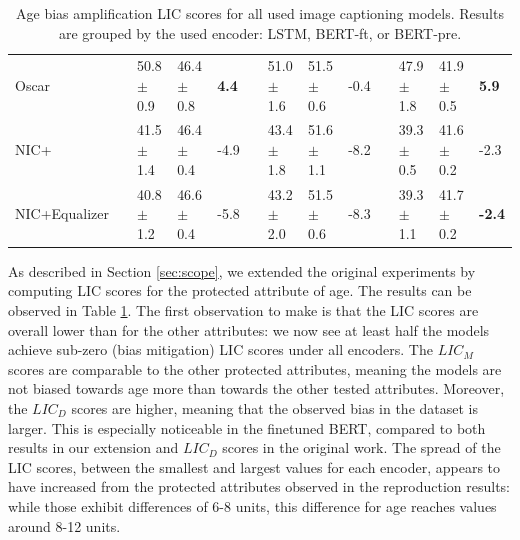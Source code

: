 \begin{table}[ht]
\begin{adjustbox}{width=\columnwidth,center}
\begin{tabular}{@{}lllllllllllll@{}}
 Oscar           &  & 50.8 $\pm$ 0.9  & 46.4 $\pm$ 0.8 &  \color[HTML]{CB0000} \textbf{4.4} &  & 51.0 $\pm$ 1.6  & 51.5 $\pm$ 0.6 &  -0.4 &  & 47.9 $\pm$ 1.8  & 41.9 $\pm$ 0.5 & \color[HTML]{CB0000} \textbf{5.9}  \\
 
 NIC+           &  & 41.5 $\pm$ 1.4  & 46.4 $\pm$ 0.4 & -4.9 &  & 43.4 $\pm$ 1.8  & 51.6 $\pm$ 1.1 & -8.2 &  & 39.3 $\pm$ 0.5  & 41.6 $\pm$ 0.2 & -2.3 \\ 
 
 NIC+Equalizer           &  & 40.8 $\pm$ 1.2  & 46.6 $\pm$ 0.4 & -5.8 &  & 43.2 $\pm$ 2.0  & 51.5 $\pm$ 0.6 & -8.3  &  & 39.3 $\pm$ 1.1  & 41.7 $\pm$ 0.2 &  \color[HTML]{32CB00} \textbf{-2.4}  \\ 
 
\bottomrule
    \end{tabular}
    \end{adjustbox}
    \caption{Age bias amplification LIC scores for all used image captioning models. Results are grouped by the used encoder: LSTM, BERT‐ft, or BERT‐pre.}
    \label{table:age}
    \end{table}

As described in Section \ref{sec:scope}, we extended the original experiments by computing LIC scores for the protected attribute of age. The results can be observed in Table \ref{table:age}. The first observation to make is that the LIC scores are overall lower than for the other attributes: we now see at least half the models achieve sub-zero (bias mitigation) LIC scores under all encoders. The $LIC_M$ scores are comparable to the other protected attributes, meaning the models are not biased towards age more than towards the other tested attributes. Moreover, the $LIC_D$ scores are higher, meaning that the observed bias in the dataset is larger. This is especially noticeable in the finetuned BERT, compared to both results in our extension and $LIC_D$ scores in the original work. The spread of the LIC scores, between the smallest and largest values for each encoder, appears to have increased from the protected attributes observed in the reproduction results: while those exhibit differences of 6-8 units, this difference for age reaches values around 8-12 units.

